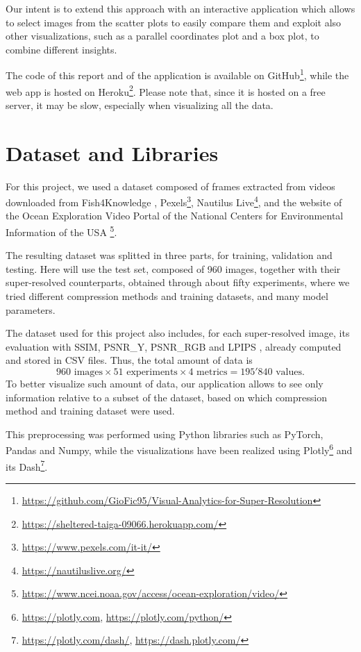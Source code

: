\documentclass[12pt]{article}
\begin{document}
	Our intent is to extend this approach with an interactive application which allows to select images from the scatter plots to easily compare them and exploit also other visualizations, such as a parallel coordinates plot and a box plot, to combine different insights.
	
	The code of this report and of the application is available on GitHub\footnote{\url{https://github.com/GioFic95/Visual-Analytics-for-Super-Resolution}}, while the web app is hosted on Heroku\footnote{\url{https://sheltered-taiga-09066.herokuapp.com/}}. Please note that, since it is hosted on a free server, it may be slow, especially when visualizing all the data.


	\section{Dataset and Libraries}\label{sec:dataset}

	For this project, we used a dataset composed of frames extracted from videos downloaded from Fish4Knowledge \cite{f4k}, Pexels\footnote{\url{https://www.pexels.com/it-it/}}, Nautilus Live\footnote{\url{https://nautiluslive.org/}}, and the website of the Ocean Exploration Video Portal of the National Centers for Environmental Information of the USA \cite{pacific}\footnote{\url{https://www.ncei.noaa.gov/access/ocean-exploration/video/}}.

	The resulting dataset was splitted in three parts, for training, validation and testing. Here will use the test set, composed of 960 images, together with their super-resolved counterparts, obtained through about fifty experiments, where we tried different compression methods and training datasets, and many model parameters.

	The dataset used for this project also includes, for each super-resolved image, its evaluation with SSIM, PSNR\_Y, PSNR\_RGB and LPIPS \cite{lpips}, already computed and stored in CSV files. Thus, the total amount of data is
	\begin{equation}
		960 \text{ images} \times 51 \text{ experiments} \times 4 \text{ metrics} = 195'840 \text{ values}.
	\end{equation}
	To better visualize such amount of data, our application allows to see only information relative to a subset of the dataset, based on which compression method and training dataset were used.

	This preprocessing was performed using Python libraries such as PyTorch, Pandas and Numpy, while the visualizations have been realized using Plotly\footnote{\url{https://plotly.com}, \url{https://plotly.com/python/}} and its Dash\footnote{\url{https://plotly.com/dash/}, \url{https://dash.plotly.com/}}.
\end{document}
